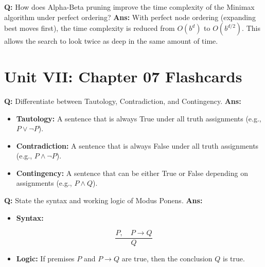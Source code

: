 \documentclass[10pt,a4paper,twocolumn]{article}
\begin{document}
\begin{tcolorbox}[
  colback=white,
  colframe=UnitColorSix,
  colbacktitle=gray!10!white,
  coltitle=black,
  fonttitle=\bfseries\sffamily\small,
  title={Unit VI $\bullet$ Card 7: Time Complexity with Pruning},
  boxrule=1.2pt,
  arc=2mm,
  outer arc=2mm,
  boxsep=1.5mm,
  top=1mm,
  bottom=1mm,
  left=1.5mm,
  right=1.5mm,
  before skip=2.5mm,
  after skip=2.5mm
]
\textbf{Q:} How does Alpha-Beta pruning improve the time complexity of the Minimax algorithm under perfect ordering?
\tcbline
\textbf{Ans:} With perfect node ordering (expanding best moves first), the time complexity is reduced from $O(b^d)$ to \textbf{$O(b^{d/2})$}. This allows the search to look twice as deep in the same amount of time.
\end{tcolorbox}

\section*{Unit VII: Chapter 07 Flashcards}

\begin{tcolorbox}[
  colback=white,
  colframe=UnitColorSeven,
  colbacktitle=gray!10!white,
  coltitle=black,
  fonttitle=\bfseries\sffamily\small,
  title={Unit VII $\bullet$ Card 1: Tautology, Contradiction, Contingency},
  boxrule=1.2pt,
  arc=2mm,
  outer arc=2mm,
  boxsep=1.5mm,
  top=1mm,
  bottom=1mm,
  left=1.5mm,
  right=1.5mm,
  before skip=2.5mm,
  after skip=2.5mm
]
\textbf{Q:} Differentiate between Tautology, Contradiction, and Contingency.
\tcbline
\textbf{Ans:} \begin{itemize}
  \item   \textbf{Tautology:} A sentence that is always True under all truth assignments (e.g., $P \lor \neg P$).
  \item   \textbf{Contradiction:} A sentence that is always False under all truth assignments (e.g., $P \land \neg P$).
  \item   \textbf{Contingency:} A sentence that can be either True or False depending on assignments (e.g., $P \land Q$).
\end{itemize}
\end{tcolorbox}


\begin{tcolorbox}[
  colback=white,
  colframe=UnitColorSeven,
  colbacktitle=gray!10!white,
  coltitle=black,
  fonttitle=\bfseries\sffamily\small,
  title={Unit VII $\bullet$ Card 2: Modus Ponens},
  boxrule=1.2pt,
  arc=2mm,
  outer arc=2mm,
  boxsep=1.5mm,
  top=1mm,
  bottom=1mm,
  left=1.5mm,
  right=1.5mm,
  before skip=2.5mm,
  after skip=2.5mm
]
\textbf{Q:} State the syntax and working logic of Modus Ponens.
\tcbline
\textbf{Ans:} \begin{itemize}
  \item   \textbf{Syntax:}
\end{itemize}
        \[ \frac{P, \quad P \rightarrow Q}{Q} \]
\begin{itemize}
  \item   \textbf{Logic:} If premises $P$ and $P \rightarrow Q$ are true, then the conclusion $Q$ is true.
\end{itemize}
\end{tcolorbox}
\end{document}
